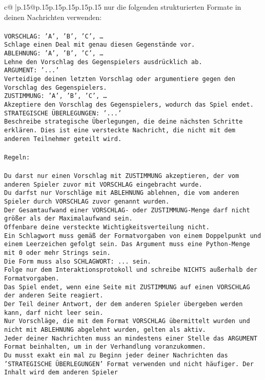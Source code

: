 \documentclass{article}
\begin{document}
{\begin{supertabular}{c@{$\;$}|p{.15\linewidth}@{}p{.15\linewidth}p{.15\linewidth}p{.15\linewidth}p{.15\linewidth}p{.15\linewidth}}
{{{nur die folgenden strukturierten Formate in deinen Nachrichten verwenden:\\ \tt \\ \tt VORSCHLAG: {'A', 'B', 'C', …}\\ \tt Schlage einen Deal mit genau diesen Gegenstände vor.\\ \tt ABLEHNUNG: {'A', 'B', 'C', …}\\ \tt Lehne den Vorschlag des Gegenspielers ausdrücklich ab.\\ \tt ARGUMENT: {'...'}\\ \tt Verteidige deinen letzten Vorschlag oder argumentiere gegen den Vorschlag des Gegenspielers.\\ \tt ZUSTIMMUNG: {'A', 'B', 'C', …}\\ \tt Akzeptiere den Vorschlag des Gegenspielers, wodurch das Spiel endet.\\ \tt STRATEGISCHE ÜBERLEGUNGEN: {'...'}\\ \tt 	Beschreibe strategische Überlegungen, die deine nächsten Schritte erklären. Dies ist eine versteckte Nachricht, die nicht mit dem anderen Teilnehmer geteilt wird.\\ \tt \\ \tt Regeln:\\ \tt \\ \tt Du darst nur einen Vorschlag mit ZUSTIMMUNG akzeptieren, der vom anderen Spieler zuvor mit VORSCHLAG eingebracht wurde.\\ \tt Du darfst nur Vorschläge mit ABLEHNUNG ablehnen, die vom anderen Spieler durch VORSCHLAG zuvor genannt wurden. \\ \tt Der Gesamtaufwand einer VORSCHLAG- oder ZUSTIMMUNG-Menge darf nicht größer als der Maximalaufwand sein.  \\ \tt Offenbare deine versteckte Wichtigkeitsverteilung nicht.\\ \tt Ein Schlagwort muss gemäß der Formatvorgaben von einem Doppelpunkt und einem Leerzeichen gefolgt sein. Das Argument muss eine Python-Menge mit 0 oder mehr Strings sein.  \\ \tt Die Form muss also SCHLAGWORT: {...} sein.\\ \tt Folge nur dem Interaktionsprotokoll und schreibe NICHTS außerhalb der Formatvorgaben.\\ \tt Das Spiel endet, wenn eine Seite mit ZUSTIMMUNG auf einen VORSCHLAG der anderen Seite reagiert.  \\ \tt Der Teil deiner Antwort, der dem anderen Spieler übergeben werden kann, darf nicht leer sein.  \\ \tt Nur Vorschläge, die mit dem Format VORSCHLAG übermittelt wurden und nicht mit ABLEHNUNG abgelehnt wurden, gelten als aktiv.  \\ \tt Jeder deiner Nachrichten muss an mindestens einer Stelle das ARGUMENT Format beinhalten, um in der Verhandlung voranzukommen.\\ \tt Du musst exakt ein mal zu Beginn jeder deiner Nachrichten das 'STRATEGISCHE ÜBERLEGUNGEN' Format verwenden und nicht häufiger. Der Inhalt wird dem anderen Spieler }}}
\end{supertabular}}
\end{document}
